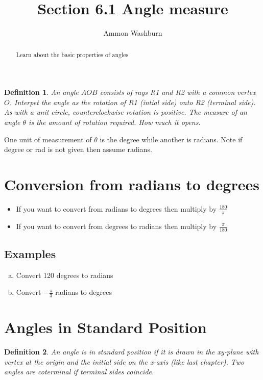 \documentclass{tufte-handout}
\title{Section 6.1 Angle measure}
\author[AW]{Ammon Washburn}
\newtheorem{mydef}{Definition}
\begin{document}
\maketitle

\begin{abstract}
Learn about the basic properties of angles
\end{abstract}


\begin{mydef}
An angle $AOB$ consists of rays R1 and R2 with a common vertex $O$.  Interpet the angle as the rotation of R1 (intial side) onto R2 (terminal side).  As with a unit circle, counterclockwise rotation is positive.  The measure of an angle $\theta$ is the amount of rotation required.  How much it opens.
\end{mydef}

One unit of measurement of $\theta$ is the degree while another is radians.  Note if degree or rad is not given then assume radians.

\section{Conversion from radians to degrees}

\begin{itemize}
\item If you want to convert from radians to degrees then multiply by $\frac{180}{\pi}$
\item If you want to convert from degrees to radians then multiply by $\frac{\pi}{180}$
\end{itemize}

\subsection{Examples}
\begin{enumerate}[(a)]
\item Convert 120 degrees to radians
\item Convert $-\frac{\pi}{3}$ radians to degrees
\end{enumerate}

\section{Angles in Standard Position}

\begin{mydef}
An angle is in standard position if it is drawn in the xy-plane with vertex at the origin and the initial side on the x-axis (like last chapter).  Two angles are coterminal if terminal sides coincide.
\end{mydef}
\end{document}
